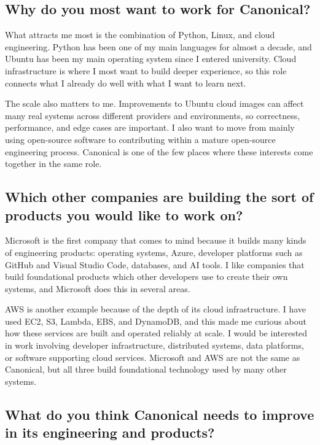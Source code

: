 \documentclass[11pt]{article}
\begin{document}
\subsection*{Why do you most want to work for Canonical?}

What attracts me most is the combination of Python, Linux, and cloud engineering. Python has been one of my main languages for almost a decade, and Ubuntu has been my main operating system since I entered university. Cloud infrastructure is where I most want to build deeper experience, so this role connects what I already do well with what I want to learn next.

The scale also matters to me. Improvements to Ubuntu cloud images can affect many real systems across different providers and environments, so correctness, performance, and edge cases are important. I also want to move from mainly using open-source software to contributing within a mature open-source engineering process. Canonical is one of the few places where these interests come together in the same role.

\subsection*{Which other companies are building the sort of products you would like to work on?}

Microsoft is the first company that comes to mind because it builds many kinds of engineering products: operating systems, Azure, developer platforms such as GitHub and Visual Studio Code, databases, and AI tools. I like companies that build foundational products which other developers use to create their own systems, and Microsoft does this in several areas.

AWS is another example because of the depth of its cloud infrastructure. I have used EC2, S3, Lambda, EBS, and DynamoDB, and this made me curious about how these services are built and operated reliably at scale. I would be interested in work involving developer infrastructure, distributed systems, data platforms, or software supporting cloud services. Microsoft and AWS are not the same as Canonical, but all three build foundational technology used by many other systems.

\subsection*{What do you think Canonical needs to improve in its engineering and products?}
\end{document}

